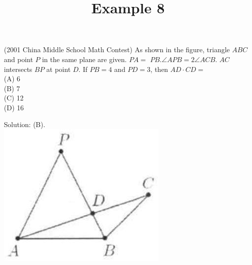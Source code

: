 \documentclass{article}
\title{Example 8}
\date{}
\begin{document}
\maketitle

(2001 China Middle School Math Contest) As shown in the figure, triangle \(A B C\) and point \(P\) in the same plane are given. \(P A=\) \(P B . \angle A P B=2 \angle A C B\). \(A C\) intersects \(B P\) at point \(D\). If \(P B=4\) and \(P D=3\), then \(A D \cdot C D=\)\\
(A) 6\\
(B) 7\\
(C) 12\\
(D) 16

Solution: (B).\\
\centering
\includegraphics[width=\textwidth]{images/problem_image_1.jpg}
\end{document}
